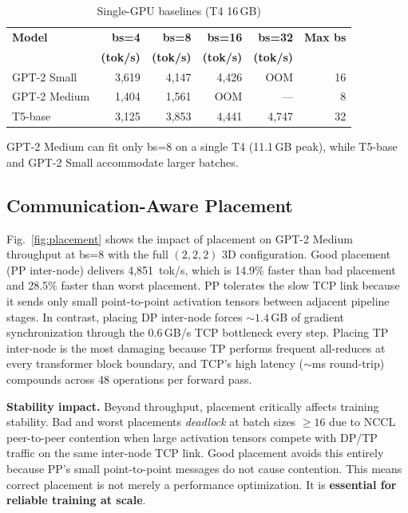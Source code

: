 \documentclass[conference]{IEEEtran}
\begin{document}
\begin{table}[h]
\centering
\caption{Single-GPU baselines (T4 16\,GB)}
\label{tab:baselines}
\small
\begin{tabular}{lrrrrr}
\toprule
\textbf{Model} & \textbf{bs=4} & \textbf{bs=8} & \textbf{bs=16} & \textbf{bs=32} & \textbf{Max bs} \\
 & \textbf{(tok/s)} & \textbf{(tok/s)} & \textbf{(tok/s)} & \textbf{(tok/s)} & \\
\midrule
GPT-2 Small & 3,619 & 4,147 & 4,426 & OOM & 16 \\
GPT-2 Medium & 1,404 & 1,561 & OOM & --- & 8 \\
T5-base & 3,125 & 3,853 & 4,441 & 4,747 & 32 \\
\bottomrule
\end{tabular}
\end{table}

GPT-2 Medium can fit only bs=8 on a single T4 (11.1\,GB peak), while T5-base and GPT-2 Small accommodate larger batches.

\subsection{Communication-Aware Placement}

Fig.~\ref{fig:placement} shows the impact of placement on GPT-2 Medium throughput at bs=8 with the full $(2,2,2)$ 3D configuration. Good placement (PP inter-node) delivers 4,851~tok/s, which is 14.9\% faster than bad placement and 28.5\% faster than worst placement. PP tolerates the slow TCP link because it sends only small point-to-point activation tensors between adjacent pipeline stages. In contrast, placing DP inter-node forces ${\sim}1.4$\,GB of gradient synchronization through the 0.6\,GB/s TCP bottleneck every step. Placing TP inter-node is the most damaging because TP performs frequent all-reduces at every transformer block boundary, and TCP's high latency (${\sim}$ms round-trip) compounds across 48 operations per forward pass.

\textbf{Stability impact.} Beyond throughput, placement critically affects training stability. Bad and worst placements \textit{deadlock} at batch sizes ${\geq}16$ due to NCCL peer-to-peer contention when large activation tensors compete with DP/TP traffic on the same inter-node TCP link. Good placement avoids this entirely because PP's small point-to-point messages do not cause contention. This means correct placement is not merely a performance optimization. It is \textbf{essential for reliable training at scale}.
\end{document}
